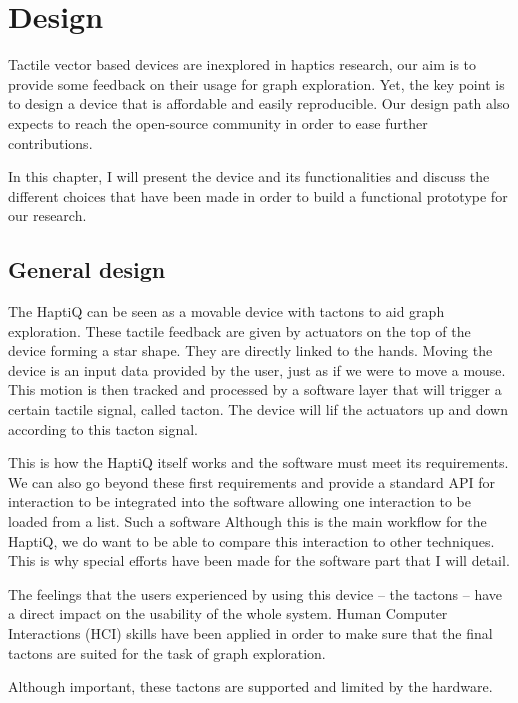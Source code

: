 \chapter{Design}

Tactile vector based devices are inexplored in haptics research, our aim is to provide some feedback on their usage for graph exploration. Yet, the key point is to design a device that is affordable and easily reproducible. Our design path also expects to reach the open-source community in order to ease further contributions.

In this chapter, I will present the device and its functionalities and discuss the different choices that have been made in order to build a functional prototype for our research.

\section{General design}\label{global-design}

The HaptiQ can be seen as a movable device with tactons to aid graph
exploration. These tactile feedback are given by actuators on the top of
the device forming a star shape. They are directly linked to the hands.
Moving the device is an input data provided by the user, just as if we
were to move a mouse. This motion is then tracked and processed by a
software layer that will trigger a certain tactile signal, called
tacton. The device will lif the actuators up and down according to this
tacton signal.

This is how the HaptiQ itself works and the software must meet its
requirements. We can also go beyond these first requirements and provide
a standard API for interaction to be integrated into the software
allowing one interaction to be loaded from a list. Such a software
Although this is the main workflow for the HaptiQ, we do want to be able
to compare this interaction to other techniques. This is why special
efforts have been made for the software part that I will detail.

The feelings that the users experienced by using this device -- the
tactons -- have a direct impact on the usability of the whole system.
Human Computer Interactions (HCI) skills have been applied in order to
make sure that the final tactons are suited for the task of graph
exploration.

Although important, these tactons are supported and limited by the
hardware.

